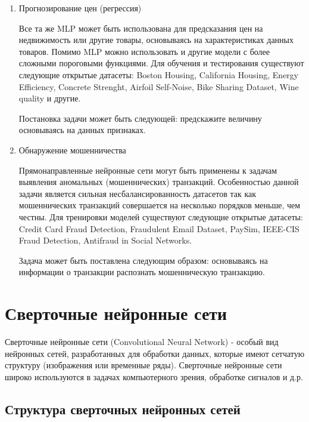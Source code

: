{\begin{enumerate}
При помощи MLP можно решать задачу классификации изображений. Для обучения и тестирования
существует большое количество открытых датасетов таких как: MNIST, Fashion-MNIST, CIFAR-10,
CIFAR-100, ImageNet, Tiny ImageNet, Oxford Flowers 102 и множество других.

Постановка задачи может быть следующей: классифицируйте изображения, использую модель MLP.

\item Прогнозирование цен (регрессия)

Все та же MLP может быть использована для предсказания цен на недвижимость или другие товары,
основываясь на характеристиках данных товаров. Помимо MLP можно использовать и другие модели с
более сложными пороговыми функциями. Для обучения и тестирования существуют следующие открытые
датасеты: Boston Housing, California Housing, Energy Efficiency, Concrete Strenght, Airfoil
Self-Noise, Bike Sharing Dataset, Wine quality и другие.

Постановка задачи может быть следующей: предскажите величину основываясь на данных признаках.

\item Обнаружение мошенничества

Прямонаправленные нейронные сети могут быть применены к задачам выявления аномальных
(мошеннических) транзакций. Особенностью данной задачи является сильная несбалансированность
датасетов так как мошеннических транзакций совершается на несколько порядков меньше, чем
честны. Для тренировки моделей существуют следующие открытые датасеты: Credit Card Fraud
Detection, Fraudulent Email Dataset, PaySim, IEEE-CIS Fraud Detection, Antifraud in Social
Networks.

Задача может быть поставлена следующим образом: основываясь на информации о транзакции распознать
мошенническую транзакцию.
\end{enumerate}


\section{Сверточные нейронные сети}
Сверточные нейронные сети (Convolutional Neural Network) - особый вид нейронных сетей, разработанных
для обработки данных, которые имеют сетчатую структуру (изображения или временные ряды). Сверточные
нейронные сети широко используются в задачах компьютерного зрения, обработке сигналов и д.р.

\subsection{Структура сверточных нейронных сетей}

}
